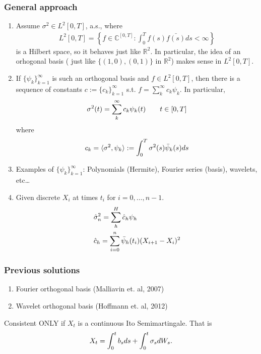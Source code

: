 \documentclass[fleqn]{beamer}
\begin{document}
\begin{frame}[allowframebreaks]
  \frametitle{General approach}
  \begin{enumerate}
    \item Assume $\sigma^2 \in L^2[0, T]$, a.s., where 
      \begin{align}
        L^2[0,T] = \left\{ f \in \mathbb{C}^{[0,T]}: \int^T_0 f(s) \bar{f(s)} d s < \infty\right\}
      \end{align}
      is a Hilbert space, so it behaves just like $\mathbb{R}^2$. In particular, the idea of an orhogonal basis ( just like $\{(1,0), (0,1)\}$ in $\mathbb{R}^2$) makes sense in $L^2[0,T]$.  
    \item If $\{\psi_k\}_{k =1}^\infty$ is such an orthogonal basis and  $f \in L^2[0,T]$, then there is a sequence of constants $c := \{c_k\}_{k = 1}^\infty$ s.t. $f = \sum_k^{\infty} c_k \psi_k$. 
    In particular,  
      \begin{align}
        \sigma^2(t)  &= \sum_k^{\infty} c_k \psi_k(t) \qquad t \in [0,T]\notag\\
        \label{}
      \end{align}
      where 
      \begin{align}
        c_k = \langle \sigma^2 , \psi_k\rangle : = \int^T_0 \sigma^2(s) \bar{\psi}_k(s) d s\notag
        \label{}
      \end{align}
    \item Examples of $\{\psi_k\}_{k =1}^\infty$: Polynomials (Hermite), Fourier series (basis), wavelets, etc\dots 
    \item Given discrete $X_i$ at times $t_i$ for $i = 0, \dots, n-1$.
      \begin{align}
        &\hat{\sigma}^2_n  = \sum_h^H \hat{c}_h \psi_h\notag\\
        &\hat{c}_h = \sum^n_{i = 0} \bar{\psi}_h(t_i)(X_{i +1} - X_i)^2 
        \label{}
      \end{align}
  \end{enumerate}
\end{frame}
\begin{frame}
  \frametitle{Previous solutions}
   \begin{enumerate}
    \item Fourier orthogonal basis (Malliavin et. al, 2007)
    \item Wavelet orthogonal basis (Hoffmann et. al, 2012)
  \end{enumerate}
  Consistent ONLY if $X_t$ is a continuous Ito Semimartingale.
  That is \begin{align}
    X_t = \int^t_0 b_s d s + \int^t_0 \sigma_s d W_s. \notag
    \label{}
  \end{align}
\end{frame}
\end{document}
